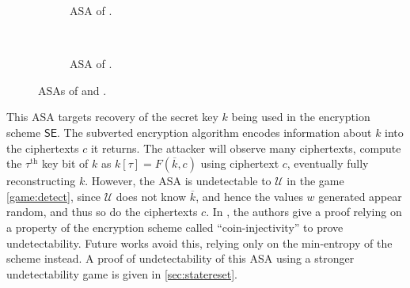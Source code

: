 \begin{figure}
\centering
\begin{subfigure}[t]{0.3\textwidth}
\centering
{}
\caption{ASA of \cite{C:BelPatRog14}.}
\label{figure:bprsubv}
\end{subfigure}~~\vrule~~~
\begin{subfigure}[t]{0.3\textwidth}
\centering
{}
\caption{ASA of \cite{CCS:BelJaeKan15}.}
\label{figure:bjksubv}
\end{subfigure}
\caption[ASAs of \cite{C:BelPatRog14} and \cite{CCS:BelJaeKan15}]{ASAs of \cite{C:BelPatRog14} and \cite{CCS:BelJaeKan15}.}
\label{figure:bprandbjk}
\end{figure}

This ASA targets recovery of the secret key $k$ being used in the encryption scheme $\mathsf{SE}$. The subverted encryption algorithm encodes information about $k$ into the ciphertexts $c$ it returns. The attacker will observe many ciphertexts, compute the $\tau^\text{th}$ key bit of $k$ as $k[\tau]=F(\overline{k}, c)$ using ciphertext $c$, eventually fully reconstructing $k$. However, the ASA is undetectable to $\mathcal{U}$ in the game \autoref{game:detect}, since $\mathcal{U}$ does not know $\overline{k}$, and hence the values $w$ generated appear random, and thus so do the ciphertexts $c$. In \cite{C:BelPatRog14}, the authors give a proof relying on a property of the encryption scheme called ``coin-injectivity'' to prove undetectability. Future works avoid this, relying only on the min-entropy of the scheme instead. A proof of undetectability of this ASA using a stronger undetectability game is given in \autoref{sec:statereset}.

